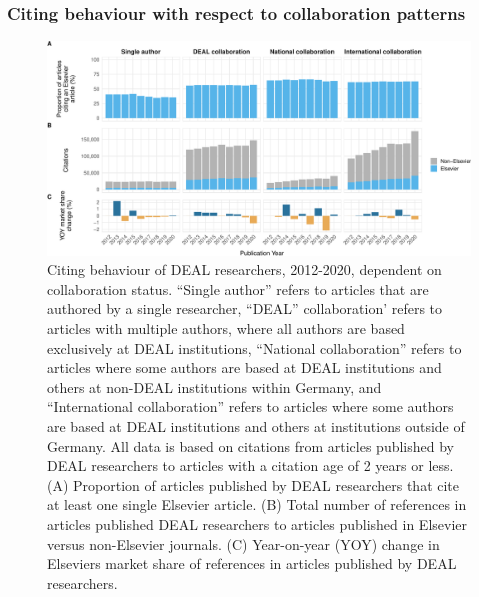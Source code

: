 \documentclass[
]{article}
\begin{document}
\hypertarget{citing-behaviour-with-respect-to-collaboration-patterns}{%
\subsubsection{Citing behaviour with respect to collaboration patterns}\label{citing-behaviour-with-respect-to-collaboration-patterns}}



\begin{figure}

{\centering \includegraphics{analysis_files/figure-latex/references-publisher-year-collaboration-1} 

}

\caption{Citing behaviour of DEAL researchers, 2012-2020, dependent on collaboration status. ``Single author'' refers to articles that are authored by a single researcher, ``DEAL'' collaboration' refers to articles with multiple authors, where all authors are based exclusively at DEAL institutions, ``National collaboration'' refers to articles where some authors are based at DEAL institutions and others at non-DEAL institutions within Germany, and ``International collaboration'' refers to articles where some authors are based at DEAL institutions and others at institutions outside of Germany. All data is based on citations from articles published by DEAL researchers to articles with a citation age of 2 years or less. (A) Proportion of articles published by DEAL researchers that cite at least one single Elsevier article. (B) Total number of references in articles published DEAL researchers to articles published in Elsevier versus non-Elsevier journals. (C) Year-on-year (YOY) change in Elsevier\textquotesingle s market share of references in articles published by DEAL researchers.}\label{fig:references-publisher-year-collaboration}
\end{figure}
\end{document}
